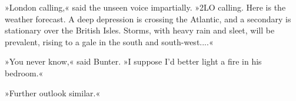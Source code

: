 »London calling,« said the unseen voice impartially. »2LO calling. Here is the weather forecast. A deep depression is crossing the Atlantic, and a secondary is stationary over the British Isles. Storms, with heavy rain and sleet, will be prevalent, rising to a gale in the south and south-west....«

»You never know,« said Bunter. »I suppose I'd better light a fire in his bedroom.«

»Further outlook similar.«
